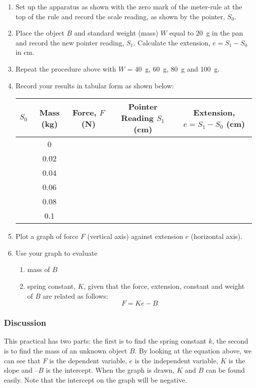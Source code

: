 \begin{enumerate}
\item{Set up the apparatus as shown with the zero mark of the meter-rule at the top
of the rule and record the scale reading, as shown by the pointer, $S_0$.}
\item{Place the object $B$ and standard weight (mass) $W$ equal to 20~g in the pan
and record the new pointer reading, $S_1$. Calculate the extension, $e = S_1 - S_0$ in
cm.}
\item{Repeat the procedure above with $W$ = 40~g, 60~g, 80~g and 100~g.}
\item{Record your results in tabular form as shown below:

\begin{center}
\begin{tabular}{ | c | c | c | c | c | }
\hline
$S_0$ & Mass (kg) & Force, $F$ (N) & Pointer Reading $S_1$ (cm) & Extension, $e = S_1 - S_0$ (cm) \\ \hline
& 0 & & & \\ \hline
& 0.02 & & & \\ \hline
& 0.04 & & & \\ \hline
& 0.06 & & & \\ \hline
& 0.08 & & & \\ \hline
& 0.1 & & & \\ \hline
\end{tabular}
\end{center}

}%
\item{Plot a graph of force $F$ (vertical axis) against extension $e$ (horizontal axis).}
\item{Use your graph to evaluate
\begin{enumerate}
\item{mass of $B$}
\item{spring constant, $K$, given that the force, extension, constant and
weight of $B$ are related as follows: $$F = Ke - B$$}
\end{enumerate}
}%
\end{enumerate}

\subsubsection{Discussion}

This practical has two parts: the first is to find the spring constant $k$, the second is
to find the mass of an unknown object $B$. By looking at the equation above, we
can see that $F$ is the dependent variable, $e$ is the independent variable, $K$ is the slope and
$–B$ is the intercept. When the graph is drawn, $K$ and $B$ can be found easily. Note that the
intercept on the graph will be negative.

